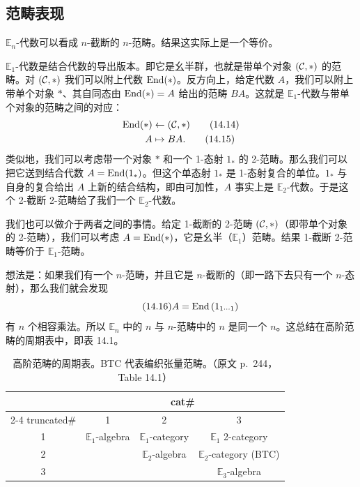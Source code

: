 \subsection{范畴表现}\label{sec:14-1-4}

$\mathbb{E}_n$-代数可以看成 $n$-截断的 $n$-范畴。结果这实际上是一个等价。

$\mathbb{E}_1$-代数是结合代数的导出版本。即它是幺半群，也就是带单个对象 $(\mathcal{C},*)$ 的范畴。对 $(\mathcal{C},*)$ 我们可以附上代数 $\mathrm{End}(*)$。反方向上，给定代数 $A$，我们可以附上带单个对象 $*$、其自同态由 $\mathrm{End}(*)=A$ 给出的范畴 $BA$。这就是 $\mathbb{E}_1$-代数与带单个对象的范畴之间的对应：
\begin{align}
\mathrm{End}(*)&\leftarrow(\mathcal{C},*) \tag{14.14}\\
A&\mapsto BA. \tag{14.15}
\end{align}
类似地，我们可以考虑带一个对象 $*$ 和一个 1-态射 $1_*$ 的 2-范畴。那么我们可以把它送到结合代数 $A=\mathrm{End}(1_*)$。但这个单态射 $1_*$ 是 1-态射复合的单位。$1_*$ 与自身的复合给出 $A$ 上新的结合结构，即由可加性，$A$ 事实上是 $\mathbb{E}_2$-代数。于是这个 2-截断 2-范畴给了我们一个 $\mathbb{E}_2$-代数。

我们也可以做介于两者之间的事情。给定 1-截断的 2-范畴 $(\mathcal{C},*)$（即带单个对象的 2-范畴），我们可以考虑 $A=\mathrm{End}(*)$，它是幺半（$\mathbb{E}_1$）范畴。结果 1-截断 2-范畴等价于 $\mathbb{E}_1$-范畴。

想法是：如果我们有一个 $n$-范畴，并且它是 $n$-截断的（即一路下去只有一个 $n$-态射），那么我们就会发现
\begin{equation}\tag{14.16}
A=\mathrm{End}\left(1_{1\cdots1}\right)
\end{equation}
有 $n$ 个相容乘法。所以 $\mathbb{E}_n$ 中的 $n$ 与 $n$-范畴中的 $n$ 是同一个 $n$。这总结在高阶范畴的周期表中，即表 14.1。

\begin{table}[htbp]
\centering
\caption{高阶范畴的周期表。BTC 代表编织张量范畴。（原文 p.~244，Table 14.1）}
\label{tab:14-1}
\small
\begin{tabular}{c|ccc}
\toprule
\multicolumn{1}{c}{} & \multicolumn{3}{c}{cat\#}\\
\cmidrule(lr){2-4}
truncated\# & 1 & 2 & 3\\
\midrule
1 & $\mathbb{E}_1$-algebra & $\mathbb{E}_1$-category & $\mathbb{E}_1$ 2-category\\
2 & & $\mathbb{E}_2$-algebra & $\mathbb{E}_2$-category (BTC)\\
3 & & & $\mathbb{E}_3$-algebra\\
\bottomrule
\end{tabular}
\end{table}

